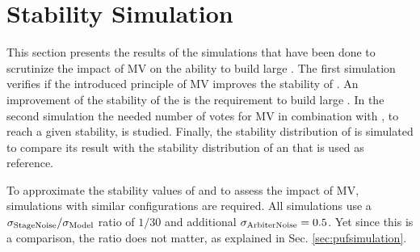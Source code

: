 \chapter{Stability Simulation}
\label{cap:stabilitysimulation}

This section presents the results of the simulations that have been done to scrutinize the impact of \ac{MV} on the ability to build large \mxpufs.
The first simulation verifies if the introduced principle of \ac{MV} improves the stability of \apuf.
An improvement of the stability of the \apufs is the requirement to build large \xpufs.
In the second simulation the needed number of votes for \ac{MV} in combination with \xpufs, to reach a given stability, is studied.
Finally, the stability distribution of \mxpufs is simulated to compare its result with the stability distribution of an \apuf that is used as reference.

To approximate the stability values of \pufs and to assess the impact of \ac{MV}, simulations with similar configurations are required.
All simulations use a $\sigma_{\mathrm{Stage Noise}}/\sigma_{\mathrm{Model}}$ ratio of $1/30$ and additional $\sigma_{\mathrm{Arbiter Noise}} = 0.5$.
Yet since this is a comparison, the ratio does not matter, as explained in Sec. \ref{sec:pufsimulation}.


